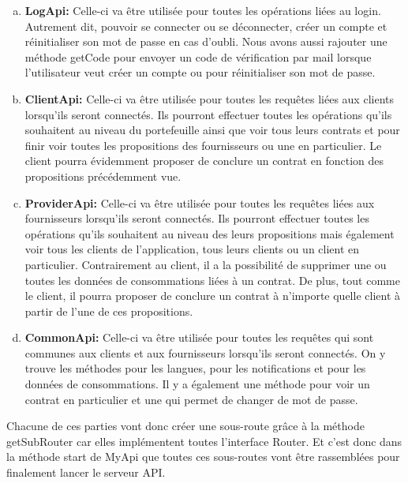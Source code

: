 \begin{enumerate}[a)]
\item \textbf{LogApi:}\newline
Celle-ci va être utilisée pour toutes les opérations liées au login. Autrement dit, pouvoir se connecter ou se déconnecter, créer un compte et réinitialiser son mot de passe en cas d'oubli. Nous avons aussi rajouter une méthode getCode pour envoyer un code de vérification par mail lorsque l'utilisateur veut créer un compte ou pour réinitialiser son mot de passe.
\item \textbf{ClientApi:}\newline
Celle-ci va être utilisée pour toutes les requêtes liées aux clients lorsqu'ils seront connectés. Ils pourront effectuer toutes les opérations qu'ils souhaitent au niveau du portefeuille ainsi que voir tous leurs contrats et pour finir voir toutes les propositions des fournisseurs ou une en particulier. Le client pourra évidemment proposer de conclure un contrat en fonction des propositions précédemment vue.
\item \textbf{ProviderApi:}\newline
Celle-ci va être utilisée pour toutes les requêtes liées aux fournisseurs lorsqu'ils seront connectés. Ils pourront effectuer toutes les opérations qu'ils souhaitent au niveau des leurs propositions mais également voir tous les clients de l'application, tous leurs clients ou un client en particulier. Contrairement au client, il a la possibilité de supprimer une ou toutes les données de consommations liées à un contrat. De plus, tout comme le client, il pourra proposer de conclure un contrat à n'importe quelle client à partir de l'une de ces propositions.
\item \textbf{CommonApi:}\newline
Celle-ci va être utilisée pour toutes les requêtes qui sont communes aux clients et aux fournisseurs lorsqu'ils seront connectés. On y trouve les méthodes pour les langues, pour les notifications et pour les données de consommations. Il y a également une méthode pour voir un contrat en particulier et une qui permet de changer de mot de passe.
\end{enumerate}
\newpage
\begin{flushleft}
Chacune de ces parties vont donc créer une sous-route grâce à la méthode getSubRouter car elles implémentent toutes l'interface Router. Et c'est donc dans la méthode start de MyApi que toutes ces sous-routes vont être rassemblées pour finalement lancer le serveur API.
\end{flushleft}

